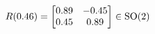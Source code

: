 \documentclass[preview]{standalone}
\begin{document}
\begin{align*}
\special{dvisvgm:raw <g id='unique000'>}R(0.46) = \begin{bmatrix} 0.89 & -0.45 \\ 0.45 & 0.89 \end{bmatrix} \in \text{SO}(2)\special{dvisvgm:raw </g>}
\end{align*}
\end{document}
